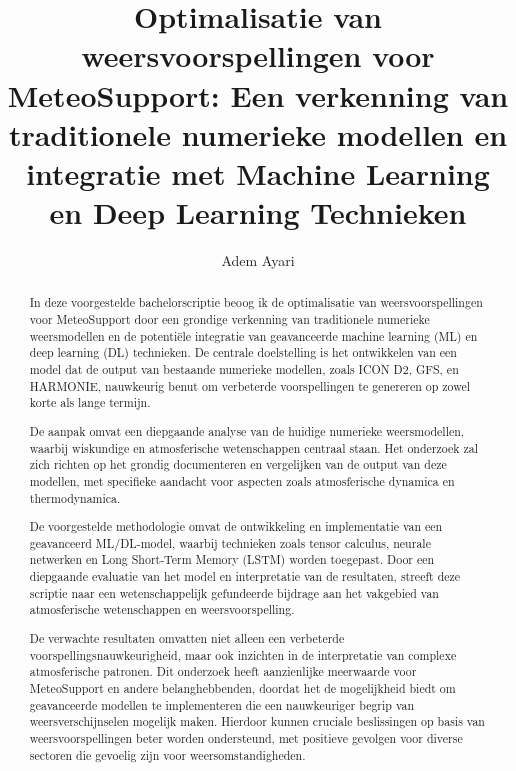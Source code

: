 \documentclass{hogent-article}
\title{Optimalisatie van weersvoorspellingen voor MeteoSupport: Een verkenning van traditionele numerieke modellen en integratie met Machine Learning en Deep Learning Technieken}
\author{Adem Ayari}
\begin{document}
\begin{abstract}
    In deze voorgestelde bachelorscriptie beoog ik de optimalisatie van weersvoorspellingen voor MeteoSupport door een grondige verkenning van traditionele numerieke weersmodellen en de potentiële integratie van geavanceerde machine learning (ML) en deep learning (DL) technieken. De centrale doelstelling is het ontwikkelen van een model dat de output van bestaande numerieke modellen, zoals ICON D2, GFS, en HARMONIE, nauwkeurig benut om verbeterde voorspellingen te genereren op zowel korte als lange termijn.
    
    \vspace{\baselineskip}
    
    De aanpak omvat een diepgaande analyse van de huidige numerieke weersmodellen, waarbij wiskundige en atmosferische wetenschappen centraal staan. Het onderzoek zal zich richten op het grondig documenteren en vergelijken van de output van deze modellen, met specifieke aandacht voor aspecten zoals atmosferische dynamica en thermodynamica.
    
    \vspace{\baselineskip}
    
    De voorgestelde methodologie omvat de ontwikkeling en implementatie van een geavanceerd ML/DL-model, waarbij technieken zoals tensor calculus, neurale netwerken en Long Short-Term Memory (LSTM) worden toegepast. Door een diepgaande evaluatie van het model en interpretatie van de resultaten, streeft deze scriptie naar een wetenschappelijk gefundeerde bijdrage aan het vakgebied van atmosferische wetenschappen en weersvoorspelling.
    
    \vspace{\baselineskip}
    
    De verwachte resultaten omvatten niet alleen een verbeterde voorspellingsnauwkeurigheid, maar ook inzichten in de interpretatie van complexe atmosferische patronen. Dit onderzoek heeft aanzienlijke meerwaarde voor MeteoSupport en andere belanghebbenden, doordat het de mogelijkheid biedt om geavanceerde modellen te implementeren die een nauwkeuriger begrip van weersverschijnselen mogelijk maken. Hierdoor kunnen cruciale beslissingen op basis van weersvoorspellingen beter worden ondersteund, met positieve gevolgen voor diverse sectoren die gevoelig zijn voor weersomstandigheden.
\end{abstract}

\tableofcontents



\printbibliography[heading=bibintoc]
\end{document}
